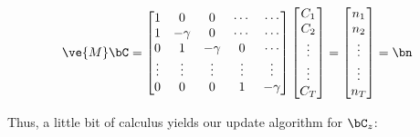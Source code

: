 \begin{align} \label{eq:M}
\ve{M} \bC = %
\begin{bmatrix}
1 & 0  & 0 & \cdots & \cdots \\
1 & -\gamma & 0 & \cdots & \cdots \\
0 & 1 & -\gamma & 0 & \cdots  \\
\vdots & \vdots & \vdots & \vdots & \vdots  \\
0 & 0 & 0 & 1 & -\gamma
\end{bmatrix}
\begin{bmatrix}
C_1 \\ C_2 \\ \vdots \\ \vdots \\ C_T  
\end{bmatrix}
= 
\begin{bmatrix}
n_1 \\ n_2 \\ \vdots \\ \vdots \\ n_T
\end{bmatrix}
= \bn
\end{align}

%

Thus, a little bit of calculus yields our update algorithm for $\bC_z$:


